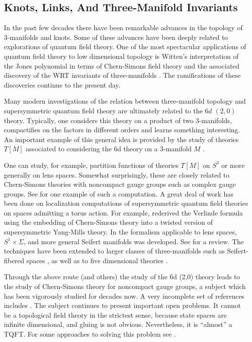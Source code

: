 \documentclass[12pt]{article}
\begin{document}
\subsection{Knots, Links,  And Three-Manifold Invariants}\label{subsec:Knot-3-Fold}

In the past few decades there have been remarkable advances in
the topology of 3-manifolds and knots. Some of these advances 
have been deeply related to explorations of quantum field theory. 
One of the most spectacular applications of quantum field theory 
to low dimensional topology is Witten's interpretation of the Jones 
polynomial in terms of Chern-Simons field theory 
\cite{Witten:1988hf} and the associated 
discovery of the WRT invariants of three-manifolds \cite{Reshetikhin:1990pr,Reshetikhin:1991tc}.
The ramifications of these discoveries continue to the present day. 

Many modern investigations of the relation between 
three-manifold topology and supersymmetric quantum field 
theory are ultimately related to the $6d$ $(2,0)$ theory. 
Typically, one considers this theory on a product of 
two 3-manifolds, compactifies on the factors in different 
orders and learns something interesting. 
An important example of this general idea is provided by the study of theories $T[M]$ associated to considering the 6d theory on a 3-manifold $M$ \cite{Dimofte:2011ju}. 


One can study, for example, partition 
functions of theories $T[M]$ on $S^3$ or more generally on lens spaces. 
Somewhat surprisingly, these 
are closely related to Chern-Simons theories 
with noncompact gauge groups such as complex gauge groups. See \cite{Cordova:2013cea}
for one example of such a computation. 
A great deal of work has been done on localization computations of supersymmetric quantum field theories on spaces admitting a torus action. For example, \cite{NikThesis} rederived the Verlinde formula using the embedding of Chern-Simons theory into a twisted version of supersymmetric Yang-Mills theory. In \cite{NikBaulieuLosev, beasley2005nonabelian} the formalism applicable to lens spaces,  
$S^1 \times \Sigma$, and more general Seifert manifolds was developed. See \cite{Willett:2016adv}
for a review. The techniques have been extended to larger classes of three-manifolds such as Seifert-fibered spaces  
\cite{Closset:2016arn,Closset:2017zgf,
Closset:2018ghr,Closset:2019ucb,
Closset:2019hyt, Eckhard:2019jgg}, as well as to five dimensional theories \cite{Kallen:2012cs}.

Through the above route (and others) the 
study of the 6d (2,0) theory leads to the study of Chern-Simons theory for 
noncompact gauge groups, a subject which  has been vigorously studied for decades now. 
A very incomplete set of references includes
\cite{Andersen:2014aoa,Dimofte:2009yn, Dimofte:2016pua,Witten:1989ip,Witten:2010cx}. 
The subject continues to present important open problems. 
It cannot be a topological field theory
in the strictest sense, because state spaces 
are infinite dimensional, and gluing is not 
obvious. Nevertheless, it is ``almost'' a TQFT. 
For some approaches to solving this problem 
see \cite{Andersen:2018pnw,Gukov:2015sna,Gukov:2017kmk,Closset:2019hyt}.  
\end{document}

